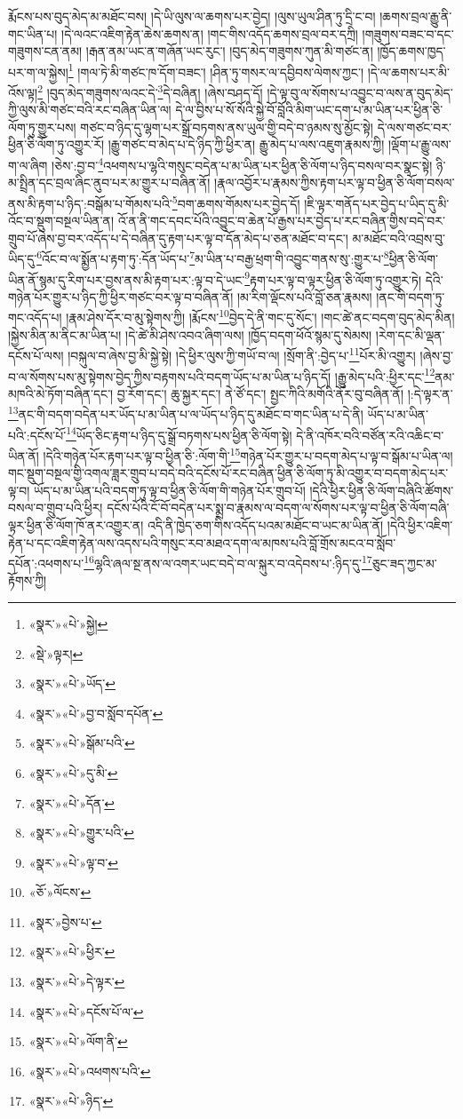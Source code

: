 རྨོངས་པས་བུད་མེད་མ་མཐོང་བས། །དེ་ཡི་ལུས་ལ་ཆགས་པར་བྱེད། །ལུས་ཡུལ་ཤིན་ཏུ་དྲི་ང་བ། །ཆགས་བྲལ་རྒྱུ་ནི་གང་ཡིན་པ། །དེ་ལའང་འཇིག་རྟེན་ཆེས་ཆགས་ན། །གང་གིས་འདོད་ཆགས་བྲལ་བར་དཀྲི། །གཟུགས་བཟང་བ་དང་གཟུགས་ངན་ནམ། །རྒན་ནམ་ཡང་ན་གཞོན་ཡང་རུང་། །བུད་མེད་གཟུགས་ཀུན་མི་གཙང་ན། །ཁྱོད་ཆགས་ཁྱད་པར་ག་ལ་སྐྱེས།\footnote{«སྣར་»«པེ་»སྐྱེ།} །གལ་ཏེ་མི་གཙང་ཁ་དོག་བཟང་། །ཤིན་ཏུ་གསར་ལ་དབྱིབས་ལེགས་ཀྱང་། །དེ་ལ་ཆགས་པར་མི་འོས་ལྟ།\footnote{«སྡེ་»ལྟར།} །བུད་མེད་གཟུགས་ལའང་དེ་\footnote{«སྣར་»«པེ་»ཡོད་}དེ་བཞིན། །ཞེས་བཤད་དོ། །དེ་ལྟ་བུ་ལ་སོགས་པ་འབྱུང་བ་ལས་ན་བུད་མེད་ཀྱི་ལུས་མི་གཙང་བའི་རང་བཞིན་ཡིན་ལ། དེ་ལ་བྱིས་པ་སོ་སོའི་སྐྱེ་བོ་བློའི་མིག་ཡང་དག་པ་མ་ཡིན་པར་ཕྱིན་ཅི་ལོག་ཏུ་གྱུར་པས། གཙང་བ་ཉིད་དུ་ལྷག་པར་སྒྲོ་བཏགས་ནས་ཡུལ་གྱི་བདེ་བ་ཉམས་སུ་མྱོང་སྟེ། དེ་ལས་གཙང་བར་ཕྱིན་ཅི་ལོག་ཏུ་འགྱུར་རོ། །རྒྱུ་གཙང་བ་མེད་པ་དེ་ཉིད་ཀྱི་ཕྱིར་ན། རྒྱུ་མེད་པ་ལས་འཇུག་རྣམས་ཀྱི། །ལྡོག་པ་རྒྱུ་ལས་ག་ལ་ཞིག །ཅེས་:བྱ་བ་\footnote{«སྣར་»«པེ་»བྱ་བ་སློབ་དཔོན་}འཕགས་པ་ལྷའི་གསུང་བདེན་པ་མ་ཡིན་པར་ཕྱིན་ཅི་ལོག་པ་ཉིད་བསལ་བར་སྣང་སྟེ། ཉི་མ་སྤྲིན་དང་བྲལ་ཞིང་ནུབ་པར་མ་གྱུར་པ་བཞིན་ནོ། །རྣལ་འབྱོར་པ་རྣམས་ཀྱིས་རྟག་པར་ལྟ་བ་ཕྱིན་ཅི་ལོག་བསལ་ནས་མི་རྟག་པ་ཉིད་:བསྒོམ་པ་གོམས་པའི་\footnote{«སྣར་»«པེ་»སྒོམ་པའི་}བག་ཆགས་གོམས་པར་བྱེད་དོ། །ཇི་ལྟར་གནོད་པར་བྱེད་པ་ཡིད་དུ་མི་འོང་བ་སྡུག་བསྔལ་ཡིན་ན། འོ་ན་ནི་གང་དབང་པོའི་འབྱུང་བ་ཆེན་པོ་རྒྱས་པར་བྱེད་པ་རང་བཞིན་གྱིས་བདེ་བར་གྲུབ་པོ་ཞེས་བྱ་བར་འདོད་པ་དེ་བཞིན་དུ་རྟག་པར་ལྟ་བ་དོན་མེད་པ་ཅན་མཐོང་བ་དང་། མ་མཐོང་བའི་འབྲས་བུ་ཡིད་དུ་\footnote{«སྣར་»«པེ་»དུ་མི་}འོང་བ་ལ་སྨྱོན་པ་རྟག་ཏུ་:དོན་ཡོད་པ་\footnote{«སྣར་»«པེ་»དོན་}མ་ཡིན་པ་བརྒྱ་ཕྲག་གི་འབྱུང་གནས་སུ་:གྱུར་པ་\footnote{«སྣར་»«པེ་»གྱུར་པའི་}ཕྱིན་ཅི་ལོག་ཡིན་ནོ་སྙམ་དུ་རིག་པར་བྱས་ནས་མི་རྟག་པར་:ལྟ་བ་དེ་ཡང་\footnote{«སྣར་»«པེ་»ལྟ་བ་}རྟག་པར་ལྟ་བ་ལྟར་ཕྱིན་ཅི་ལོག་ཏུ་འགྱུར་ཏེ། དེའི་གཉེན་པོར་གྱུར་པ་ཉིད་ཀྱི་ཕྱིར་གཙང་བར་ལྟ་བ་བཞིན་ནོ། །མ་རིག་ལྡོངས་པའི་བློ་ཅན་རྣམས། །ནང་གི་བདག་ཏུ་གང་འདོད་པ། །རྣམ་ཤེས་དོར་བ་མུ་སྟེགས་ཀྱི། །རྨོངས་\footnote{«ཅོ་»ལོངས་}བྱེད་དེ་ནི་གང་དུ་སོང་། །གང་ཚེ་ནང་བདག་བུད་མེད་མིན། །སྐྱེས་མིན་མ་ནིང་མ་ཡིན་པ། །དེ་ཚེ་མི་ཤེས་འབའ་ཞིག་ལས། །ཁྱོད་བདག་ཕོའོ་སྙམ་དུ་སེམས། །རེག་དང་མི་ལྡན་དངོས་པོ་ལས། །བསྐུལ་བ་ཞེས་བྱ་མི་སྐྱེ་སྟེ། །དེ་ཕྱིར་ལུས་ཀྱི་གཡོ་བ་ལ། །སྲོག་ནི་:བྱེད་པ་\footnote{«སྣར་»བྱེས་པ་}པོར་མི་འགྱུར། །ཞེས་བྱ་བ་ལ་སོགས་པས་མུ་སྟེགས་བྱེད་ཀྱིས་བརྟགས་པའི་བདག་ཡོད་པ་མ་ཡིན་པ་ཉིད་དོ། །རྒྱུ་མེད་པའི་:ཕྱིར་དང་\footnote{«སྣར་»«པེ་»ཕྱིར་}ནམ་མཁའི་མེ་ཏོག་བཞིན་དང་། བྱ་རོག་དང་། ཆུ་སྐྱར་དང་། ནེ་ཙོ་དང་། སྤྱང་ཀིའི་མགོའི་ནོར་བུ་བཞིན་ནོ། །:དེ་ལྟར་ན་\footnote{«སྣར་»«པེ་»དེ་ལྟར་}ནང་གི་བདག་བདེན་པར་ཡོད་པ་མ་ཡིན་པ་ལ་ཡོད་པ་ཉིད་དུ་མཐོང་བ་གང་ཡིན་པ་དེ་ནི། ཡོད་པ་མ་ཡིན་པའི་:དངོས་པོ་\footnote{«སྣར་»«པེ་»དངོས་པོ་ལ་}ཡོད་ཅིང་རྟག་པ་ཉིད་དུ་སྒྲོ་བཏགས་པས་ཕྱིན་ཅི་ལོག་སྟེ། དེ་ནི་འཁོར་བའི་བཙོན་རའི་འཆིང་བ་ཡིན་ནོ། །དེའི་གཉེན་པོར་རྟག་པར་ལྟ་བ་ཕྱིན་ཅི་:ལོག་གི་\footnote{«སྣར་»«པེ་»ལོག་ནི་}གཉེན་པོར་གྱུར་པ་བདག་མེད་པ་ལྟ་བ་སྒོམ་པ་ཡིན་ལ། གང་སྡུག་བསྔལ་གྱི་འགལ་ཟླར་གྲུབ་པ་བདེ་བའི་དངོས་པོ་རང་བཞིན་ཕྱིན་ཅི་ལོག་ཏུ་མི་འགྱུར་བ་བདག་མེད་པར་ལྟ་བ། ཡོད་པ་མ་ཡིན་པའི་བདག་ཏུ་ལྟ་བ་ཕྱིན་ཅི་ལོག་གི་གཉེན་པོར་གྲུབ་པོ། །དེའི་ཕྱིར་ཕྱིན་ཅི་ལོག་བཞིའི་ཚོགས་བསལ་བ་གྲུབ་པའི་ཕྱིར། དངོས་པོའི་ངོ་བོ་བདེན་པར་སྨྲ་བ་རྣམས་ལ་བདག་ལ་སོགས་པར་ལྟ་བ་ཕྱིན་ཅི་ལོག་བཞི་ལྟར་ཕྱིན་ཅི་ལོག་ཁོ་ནར་འགྱུར་ན། འདི་ནི་ཁྱེད་ཅག་གིས་འདོད་པའམ་མཐོང་བ་ཡང་མ་ཡིན་ནོ། །དེའི་ཕྱིར་འཇིག་རྟེན་པ་དང་འཇིག་རྟེན་ལས་འདས་པའི་གསུང་རབ་མཐའ་དག་ལ་མཁས་པའི་བློ་གྲོས་མངའ་བ་སློབ་དཔོན་:འཕགས་པ་\footnote{«སྣར་»«པེ་»འཕགས་པའི་}ལྷའི་ཞལ་སྔ་ནས་ལ་འགར་ཡང་བདེ་བ་ལ་སྐུར་བ་འདེབས་པ་:ཉིད་དུ་\footnote{«སྣར་»«པེ་»ཉིད་}ཅུང་ཟད་ཀྱང་མ་རྟོགས་ཀྱི། 